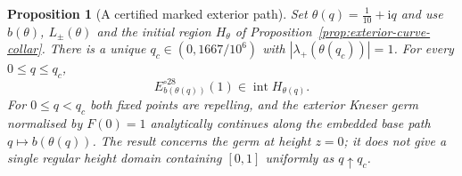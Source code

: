 \documentclass[11pt]{amsart}
\newtheorem{proposition}[theorem]{Proposition}
\theoremstyle{definition}
\newcommand{\ii}{\mathrm{i}}
\begin{document}
\begin{proposition}[A certified marked exterior path]
\label{prop:exterior-marked-path}
Set $\theta(q)=\frac1{10}+\ii q$ and use $b(\theta)$, $L_\pm(\theta)$
and the initial region $H_\theta$ of
Proposition~\ref{prop:exterior-curve-collar}.  There is a unique
$q_c\in(0,1667/10^6)$ with
$|\lambda_+(\theta(q_c))|=1$.  For every $0\le q\le q_c$,
\[
 E_{b(\theta(q))}^{\circ28}(1)\in\operatorname{int}H_{\theta(q)}.
\]
For $0\le q<q_c$ both fixed points are repelling, and the exterior
Kneser germ normalised by $F(0)=1$ analytically continues along the
embedded base path $q\mapsto b(\theta(q))$.  The result concerns the
germ at height $z=0$; it does not give a single regular height domain
containing $[0,1]$ uniformly as $q\uparrow q_c$.
\end{proposition}
\end{document}
